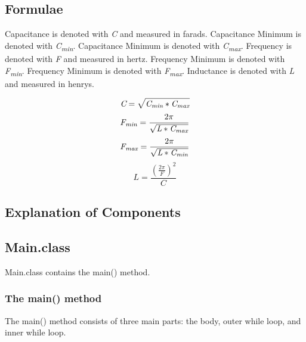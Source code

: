 \documentclass[12pt]{article}
\begin{document}
\newpage %



\begin{center}
\section{Formulae}
\end{center}
Capacitance is denoted with \textit{C} and measured in farads.
Capacitance Minimum is denoted with \textit{C\textsubscript{min}}.
Capacitance Minimum is denoted with \textit{C\textsubscript{max}}.
Frequency is denoted with \textit{F} and measured in hertz.
Frequency Minimum is denoted with \textit{F\textsubscript{min}}.
Frequency Minimum is denoted with \textit{F\textsubscript{max}}.
Inductance is denoted with \textit{L} and measured in henrys.
\par %
\begin{equation}
\textit{C} = \sqrt{\textit{C\textsubscript{min}}*\textit{C\textsubscript{max}}}
\end{equation}
\begin{equation}
\textit{F\textsubscript{min}} = \frac{2\pi}{\sqrt{\textit{L}*\textit{C\textsubscript{max}}}}
\end{equation}
\begin{equation}
\textit{F\textsubscript{max}} = \frac{2\pi}{\sqrt{\textit{L}*\textit{C\textsubscript{min}}}}
\end{equation}
\begin{equation}
\textit{L} = \frac{(\frac{2\pi}{\textit{F}})^2}{\textit{C}}
\end{equation}



\newpage %



\begin{center}
\section{Explanation of Components}
\end{center}

\subsection{Main.class}
Main.class contains the main() method.
\subsubsection{The main() method}
The main() method consists of three main parts: the body, outer while loop, and inner while loop.
\end{document}
